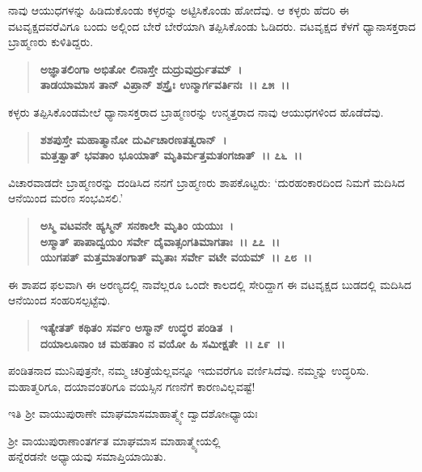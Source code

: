 ನಾವು ಆಯುಧಗಳನ್ನು ಹಿಡಿದುಕೊಂಡು ಕಳ್ಳರನ್ನು ಅಟ್ಟಿಸಿಕೊಂಡು ಹೋದೆವು. ಆ ಕಳ್ಳರು ಹೆದರಿ ಈ ವಟವೃಕ್ಷದವರೆವಿಗೂ ಬಂದು ಅಲ್ಲಿಂದ ಬೇರೆ ಬೇರೆಯಾಗಿ ತಪ್ಪಿಸಿಕೊಂಡು ಓಡಿದರು. ವಟವೃಕ್ಷದ ಕೆಳಗೆ ಧ್ಯಾನಾಸಕ್ತರಾದ ಬ್ರಾಹ್ಮಣರು ಕುಳಿತಿದ್ದರು.

\begin{verse}
\textbf{ಅಜ್ಞಾತಲಿಂಗಾ ಅಭಿತೋ ಲಿನಾಸ್ತೇ ದುದ್ರುವುರ್ದ್ರುತಮ್~।}\\\textbf{ತಾಡಯಾಮಾಸ ತಾನ್ ವಿಪ್ರಾನ್ ಶಸ್ತ್ರೈಃ ಉನ್ಮಾರ್ಗವರ್ತಿನಃ~।। ೭೫~।।}
\end{verse}

ಕಳ್ಳರು ತಪ್ಪಿಸಿಕೊಂಡಮೇಲೆ ಧ್ಯಾನಾಸಕ್ತರಾದ ಬ್ರಾಹ್ಮಣರನ್ನು ಉನ್ಮತ್ತರಾದ ನಾವು ಆಯುಧಗಳಿಂದ ಹೊಡೆದೆವು.

\begin{verse}
\textbf{ಶಶಪುಸ್ತೇ ಮಹಾತ್ಮಾನೋ ದುರ್ವಿಚಾರಣತತ್ವರಾನ್~।}\\\textbf{ಮತ್ತತ್ವಾತ್ ಭವತಾಂ ಭೂಯಾತ್ ಮೃತಿರ್ಮತ್ತಮತಂಗಜಾತ್~।। ೭೬~।।}
\end{verse}

ವಿಚಾರವಾಡದೇ ಬ್ರಾಹ್ಮಣರನ್ನು ದಂಡಿಸಿದ ನನಗೆ ಬ್ರಾಹ್ಮಣರು ಶಾಪಕೊಟ್ಟರು: `ದುರ\-ಹಂಕಾರದಿಂದ ನಿಮಗೆ ಮದಿಸಿದ ಆನೆಯಿಂದ ಮರಣ ಸಂಭವಿಸಲಿ.'

\begin{verse}
\textbf{ಅಸ್ಮಿ ವಟವನೇ ಹ್ಯಸ್ಮಿನ್ ಸನಕಾಲೇ ಮೃತಿಂ ಯಯುಃ~।}\\\textbf{ಅಸ್ಮಾತ್ ಪಾಪಾದ್ವಯಂ ಸರ್ವೇ ದೈವಾತ್ಸಂಗತಿಮಾಗತಾಃ~।। ೭೭~।। }\\\textbf{ಯುಗಪತ್ ಮತ್ತಮಾತಂಗಾತ್ ಮೃತಾಃ ಸರ್ವೇ ವಟೇ ವಯಮ್~।। ೭೮~।।}
\end{verse}

ಈ ಶಾಪದ ಫಲವಾಗಿ ಈ ಅರಣ್ಯದಲ್ಲಿ ನಾವೆಲ್ಲರೂ ಒಂದೇ ಕಾಲದಲ್ಲಿ ಸೇರಿದ್ದಾಗ ಈ ವಟವೃಕ್ಷದ ಬುಡದಲ್ಲಿ ಮದಿಸಿದ ಆನೆಯಿಂದ ಸಂಹರಿಸಲ್ಪಟ್ಟೆವು.

\begin{verse}
\textbf{ಇತ್ಯೇತತ್ ಕಥಿತಂ ಸರ್ವಂ ಅಸ್ಮಾನ್ ಉದ್ಧರ ಪಂಡಿತ~।}\\\textbf{ದಯಾಲೂನಾಂ ಚ ಮಹತಾಂ ನ ವಯೋ ಹಿ ಸಮೀಕ್ಷತೇ~।। ೭೯~।।}
\end{verse}

ಪಂಡಿತನಾದ ಮುನಿಪುತ್ರನೇ, ನಮ್ಮ ಚರಿತ್ರೆಯೆಲ್ಲವನ್ನೂ ಇದುವರೆಗೂ ವರ್ಣಿಸಿದೆವು. ನಮ್ಮನ್ನು ಉದ್ಧರಿಸು. ಮಹಾತ್ಮರಿಗೂ, ದಯಾವಂತರಿಗೂ ವಯಸ್ಸಿನ ಗಣನೆಗೆ ಕಾರಣವಿಲ್ಲವಷ್ಟೆ!

\begin{center}
ಇತಿ ಶ‍್ರೀ ವಾಯುಪುರಾಣೇ ಮಾಘಮಾಸಮಾಹಾತ್ಮ್ಯೇ ದ್ವಾದಶೋsಧ್ಯಾಯಃ
\end{center}

\begin{center}
 ಶ‍್ರೀ ವಾಯುಪುರಾಣಾಂತರ್ಗತ ಮಾಘಮಾಸ ಮಾಹಾತ್ಮ್ಯೇಯಲ್ಲಿ \\ ಹನ್ನೆರಡನೇ ಅಧ್ಯಾಯವು ಸಮಾಪ್ತಿಯಾಯಿತು.
\end{center}

